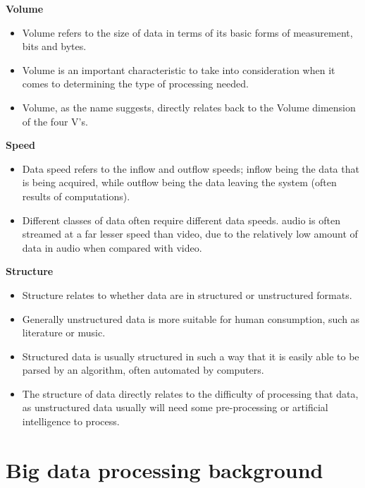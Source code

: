 \documentclass[a4paper,11pt]{article}
\begin{document}
\textbf{Volume}

\begin{itemize}
  \item Volume refers to the size of data in terms of its basic forms of measurement, bits and bytes.
  \item Volume is an important characteristic to take into consideration when it comes to determining the type of
  processing needed.
  \item Volume, as the name suggests, directly relates back to the Volume dimension of the four V's.
\end{itemize}


\textbf{Speed}

\begin{itemize}
  \item Data speed refers to the inflow and outflow speeds; inflow being the data that is being acquired, while outflow
  being the data leaving the system (often results of computations).
  \item Different classes of data often require different data speeds. \eg{}audio is often streamed at a far lesser speed
  than video, due to the relatively low amount of data in audio when compared with video.
\end{itemize}


\textbf{Structure}

\begin{itemize}
  \item Structure relates to whether data are in structured or unstructured formats.
  \item Generally unstructured data is more suitable for human consumption, such as literature or music.
  \item Structured data is usually structured in such a way that it is easily able to be parsed by an algorithm, often
  automated by computers.
  \item The structure of data directly relates to the difficulty of processing that data, as unstructured data usually
  will need some pre-processing or artificial intelligence to process.
\end{itemize}





\section{Big data processing background} %
\label{sec:big_data_processing_background}
\end{document}
